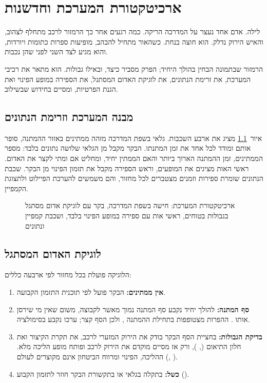 \chapter{ארכיטקטורת המערכת וחדשנות}\label{chap:architecture}
\begin{scenebox}
לילה. אדם אחד נעצר על המדרכה הריקה. כמה רגעים אחר כך הרמזור לרכב מתחלף לצהוב, והאיש הירוק נדלק.
הוא חוצה בנחת. כשהאור מתחיל להבהב, מופיעות ספרות כתומות ויורדות, והוא מגיע לצד השני לפני שהן נכבות.
\end{scenebox}

הרמזור שבתמונה הבחין בהולך היחיד; הפרק מסביר כיצד, ובאילו גבולות.
הוא מתאר את רכיבי המערכת, את זרימת הנתונים, את לוגיקת האדום המסתגל, את הספירה במופע הפינוי ואת הגנת הפרטיות, ומסיים בחידוש שבשילוב.

\section{מבנה המערכת וזרימת הנתונים}
איור~\ref{fig:t2} מציג את ארבע השכבות. גלאי בשפת המדרכה מזהה ממתינים באזור ההמתנה, סופר אותם ומודד לכל אחד את זמן המתנתו. הבקר מקבל מן הגלאי שלושה נתונים בלבד: מספר הממתינים, זמן ההמתנה הארוך ביותר והאם הממתין יחיד, ומחליט אם ומתי לקצר את האדום. ראשי האות מציגים את המופעים, וראש הספירה מקבל את תזמון הפינוי מן הבקר. שכבת הנתונים שומרת ספירות וזמנים מצטברים לכל מחזור, והם משמשים להערכת הפיילוט ולתצוגת הקמפיין.

\begin{figure}[ht]
  \centering
  \caption{ארכיטקטורת המערכת: חישה בשפת המדרכה, בקר עם לוגיקת אדום מסתגל בגבולות בטוחים, ראשי אות עם ספירה במופע הפינוי בלבד, ושכבת קמפיין ונתונים}
  \label{fig:t2}
\end{figure}

\section{לוגיקת האדום המסתגל}
הלוגיקה פועלת בכל מחזור לפי ארבעה כללים:
\begin{enumerate}
\item \textbf{אין ממתינים:} הבקר פועל לפי תוכנית התזמון הקבועה.
\item \textbf{סף המתנה:} להולך יחיד נקבע סף המתנה נמוך מאשר לקבוצה, משום שאין מי שירסן אותו \cite{rosenbloom2009,zhu2021}. ההפרות מצטופפות בתחילת ההמתנה \cite{xing2022}, ולכן הסף קצר; ערכו נקבע בסימולציה.
\item \textbf{בדיקת הגבולות:} בחציית הסף הבקר בודק את הירוק המזערי לרכב, את תקרת הקיצור ואת חלון התיאום (, ), ורק אז מסיים מוקדם את הירוק לרכב ופותח מופע הליכה מלא. ההליכה, הפינוי ומרווח הביטחון אינם מקוצרים לעולם (, ).
\item \textbf{כשל:} בתקלה בגלאי או בתקשורת הבקר חוזר לתזמון הקבוע ().
\end{enumerate}

